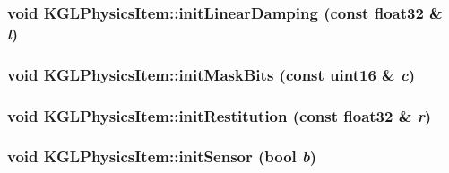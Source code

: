 \begin{CompactItemize}
\hypertarget{class_k_g_l_physics_item_8596bfa11f1267e39031d3a8b14d55e0}{
\subsubsection[{initLinearDamping}]{\setlength{\rightskip}{0pt plus 5cm}void KGLPhysicsItem::initLinearDamping (const float32 \& {\em l})}}
\label{class_k_g_l_physics_item_8596bfa11f1267e39031d3a8b14d55e0}


\hypertarget{class_k_g_l_physics_item_0837f29f919d93cfca1429415b072b22}{
\subsubsection[{initMaskBits}]{\setlength{\rightskip}{0pt plus 5cm}void KGLPhysicsItem::initMaskBits (const uint16 \& {\em c})}}
\label{class_k_g_l_physics_item_0837f29f919d93cfca1429415b072b22}


\hypertarget{class_k_g_l_physics_item_6d8c120c3abedc0e6ba56905264c1d5b}{
\subsubsection[{initRestitution}]{\setlength{\rightskip}{0pt plus 5cm}void KGLPhysicsItem::initRestitution (const float32 \& {\em r})}}
\label{class_k_g_l_physics_item_6d8c120c3abedc0e6ba56905264c1d5b}


\hypertarget{class_k_g_l_physics_item_bae743b4a3ac9f8db1b643438933a50b}{
\subsubsection[{initSensor}]{\setlength{\rightskip}{0pt plus 5cm}void KGLPhysicsItem::initSensor (bool {\em b})}}
\label{class_k_g_l_physics_item_bae743b4a3ac9f8db1b643438933a50b}



\end{CompactItemize}

